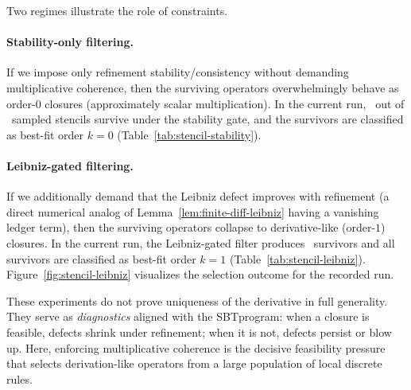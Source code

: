 \documentclass[apajournal,article,submit,moreauthors,pdftex]{Definitions/mdpi}
\newcommand{\SBT}{\textsc{SBT}}
\begin{document}
Two regimes illustrate the role of constraints.

\paragraph{Stability-only filtering.}
If we impose only refinement stability/consistency without demanding multiplicative coherence, then the surviving operators overwhelmingly behave as order-$0$ closures (approximately scalar multiplication).
In the current run, \StencilSurvivorsTotal\ out of \StencilGeneratedTotal\ sampled stencils survive under the stability gate, and the survivors are classified as best-fit order $k=0$
(Table~\ref{tab:stencil-stability}).

\paragraph{Leibniz-gated filtering.}
If we additionally demand that the Leibniz defect improves with refinement (a direct numerical analog of Lemma~\ref{lem:finite-diff-leibniz} having a vanishing ledger term), then the surviving operators collapse to derivative-like (order-$1$) closures.
In the current run, the Leibniz-gated filter produces \StencilLeibnizSurvivorsTotal\ survivors and all survivors are classified as best-fit order $k=1$
(Table~\ref{tab:stencil-leibniz}).
Figure~\ref{fig:stencil-leibniz} visualizes the selection outcome for the recorded run.

These experiments do not prove uniqueness of the derivative in full generality.
They serve as \emph{diagnostics} aligned with the \SBT program:
when a closure is feasible, defects shrink under refinement; when it is not, defects persist or blow up.
Here, enforcing multiplicative coherence is the decisive feasibility pressure that selects derivation-like operators from a large population of local discrete rules.
\end{document}
